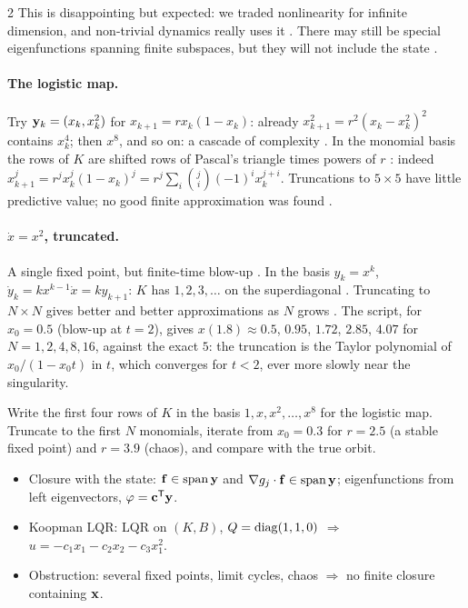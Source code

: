 \begin{paracol}{2}
This is disappointing but expected: we traded nonlinearity for infinite dimension, and non-trivial dynamics
really uses it . There may still be special eigenfunctions spanning finite subspaces, but they will
not include the state .

\paragraph{The logistic map.} Try $\mathbf{y}_k=(x_k,x_k^2)$ for $x_{k+1}=rx_k(1-x_k)$: already
$x_{k+1}^2=r^2(x_k-x_k^2)^2$ contains $x_k^4$; then $x^8$, and so on: a cascade of complexity
. In the monomial basis the rows of $K$ are shifted rows of
Pascal's triangle times powers of $r$ : indeed $x_{k+1}^j=r^jx_k^j(1-x_k)^j=r^j\sum_i\binom ji(-1)^ix_k^{j+i}$.
Truncations to $5\times5$ have little predictive value; no good finite approximation was found
.

\paragraph{$\dot x=x^2$, truncated.} A single fixed point, but finite-time blow-up . In the basis
$y_k=x^k$, $\dot y_k=kx^{k-1}\dot x=ky_{k+1}$: $K$ has $1,2,3,\dots$ on the superdiagonal
. Truncating to $N\times N$ gives better and better approximations as $N$ grows
. The script, for $x_0=0.5$ (blow-up at $t=2$), gives $x(1.8)\approx0.5$,
$0.95$, $1.72$, $2.85$, $4.07$ for $N=1,2,4,8,16$, against the exact $5$: the truncation is the Taylor
polynomial of $x_0/(1-x_0t)$ in $t$, which converges for $t<2$, ever more slowly near the singularity.

\begin{exercise}
Write the first four rows of $K$ in the basis $1,x,x^2,\dots,x^8$ for the logistic map. Truncate to the first
$N$ monomials, iterate from $x_0=0.3$ for $r=2.5$ (a stable fixed point) and $r=3.9$ (chaos), and compare with
the true orbit.
\end{exercise}

\begin{keyformulas}
\begin{itemize}
  \item Closure with the state: $\mathbf{f}\in\operatorname{span}\mathbf{y}$ and $\nabla g_j\cdot\mathbf{f}\in\operatorname{span}\mathbf{y}$;
        eigenfunctions from left eigenvectors, $\varphi=\mathbf{c}^{\mathsf T}\mathbf{y}$.
  \item Koopman LQR: LQR on $(K,B)$, $Q=\operatorname{diag}(1,1,0)$ $\Rightarrow$ $u=-c_1x_1-c_2x_2-c_3x_1^2$.
  \item Obstruction: several fixed points, limit cycles, chaos $\Rightarrow$ no finite closure containing $\mathbf{x}$.
\end{itemize}
\end{keyformulas}

\end{paracol}
